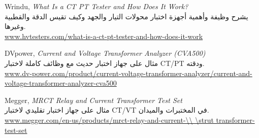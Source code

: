 \documentclass[a4paper, 14pt]{extarticle} %
\newcommand{\en}{\textenglish}
\newcommand{\s}{\strut}
\begin{document}
\begin{thebibliography}{} 
  \begin{LTR} %
    
    \en{Wrindu,
    \textit{What Is a CT PT Tester and How Does It Work?}}\\[6pt]
    \textarabic{
    يشرح وظيفة وأهمية أجهزة اختبار محولات التيار والجهد وكيف تقيس الدقة والقطبية وغيرها.}\\[6pt]
      \en{\url{www.hvtesters.com/what-is-a-ct-pt-tester-and-how-does-it-work}}
    
    \en{DVpower,
    \textit{Current and Voltage Transformer Analyzer (CVA500)}}\\[6pt]
    \textarabic{
    مثال على جهاز اختبار حديث مع وظائف كاملة لاختبار \en{CT/PT} ودقته.}\\[6pt]
      \en{\url{www.dv-power.com/product/current-voltage-transformer-analyzer/current-and-voltage-transformer-analyzer-cva500}}
    
    \en{Megger,
    \textit{MRCT Relay and Current Transformer Test Set}}\\[6pt]
    \textarabic{مثال على جهاز اختبار تقليدي لاختبار \en{CT/VT} في المختبرات والميدان.}\\[6pt]
      \en{\url{www.megger.com/en-us/products/mrct-relay-and-current-\\
      \s transformer-test-set}}

  \end{LTR}
      
    
\end{thebibliography}



    
    
\end{document}
